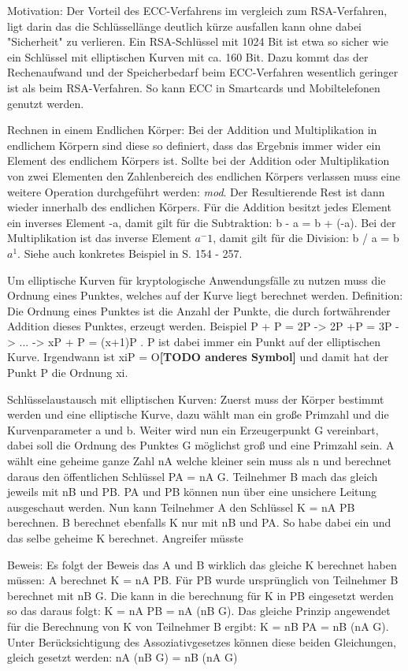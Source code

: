 		
		Motivation: Der Vorteil des ECC-Verfahrens im vergleich zum RSA-Verfahren, ligt darin das die Schlüssellänge deutlich kürze ausfallen kann ohne dabei "Sicherheit" zu verlieren. Ein RSA-Schlüssel mit 1024 Bit ist etwa so sicher wie ein Schlüssel mit elliptischen Kurven mit ca. 160 Bit. Dazu kommt das der Rechenaufwand und der Speicherbedarf beim ECC-Verfahren wesentlich geringer ist als beim RSA-Verfahren. So kann ECC in Smartcards und Mobiltelefonen genutzt werden.\cite{Information:und:Kommunikation}
		
		
		Rechnen in einem Endlichen Körper: Bei der Addition und Multiplikation in endlichem Körpern sind diese so definiert, dass das Ergebnis immer wider ein Element des endlichem Körpers ist. Sollte bei der Addition oder Multiplikation von zwei Elementen den Zahlenbereich des endlichen Körpers verlassen muss eine weitere Operation durchgeführt werden: \textit{mod}. Der Resultierende Rest ist dann wieder innerhalb des endlichen Körpers. Für die Addition besitzt jedes Element ein inverses Element -a, damit gilt für die Subtraktion: b - a = b + (-a). Bei der Multiplikation ist das inverse Element $a^-1$, damit gilt für die Division: b / a = b \mycdot $a^1$. Siehe auch konkretes Beispiel in \cite{Information:und:Kommunikation} S. 154 - 257.
		
		Um elliptische Kurven für kryptologische Anwendungsfälle zu nutzen muss die Ordnung eines Punktes, welches auf der Kurve liegt berechnet werden. Definition: Die Ordnung eines Punktes ist die Anzahl der Punkte, die durch fortwährender Addition dieses Punktes, erzeugt werden. Beispiel P + P = 2P -> 2P +P = 3P -> ... -> xP + P = (x+1)P . P ist dabei immer ein Punkt auf der elliptischen Kurve. Irgendwann ist xiP = O\textbf{[TODO anderes Symbol]} und damit hat der Punkt P die Ordnung xi.
		
		Schlüsselaustausch  mit elliptischen  Kurven: Zuerst muss der Körper bestimmt werden und eine elliptische Kurve, dazu wählt man ein große Primzahl und die Kurvenparameter a und b. Weiter wird nun ein Erzeugerpunkt G vereinbart, dabei soll die Ordnung des Punktes G möglichst groß und eine Primzahl sein. A wählt eine geheime ganze Zahl nA welche kleiner sein muss als n und berechnet daraus den öffentlichen Schlüssel PA = nA \mycdot G. Teilnehmer B mach das gleich jeweils mit nB und PB. PA und PB können nun über eine unsichere Leitung ausgeschaut werden. Nun kann Teilnehmer A den Schlüssel K = nA \mycdot PB berechnen. B berechnet ebenfalls K nur mit nB und PA. So habe dabei ein und das selbe geheime K berechnet. Angreifer müsste
		
		Beweis: Es folgt der Beweis das A und B wirklich das gleiche K berechnet haben müssen: A berechnet K = nA \mycdot PB. Für PB wurde ursprünglich von Teilnehmer B berechnet mit nB \mycdot G. Die kann in die berechnung für K in PB eingesetzt werden so das daraus folgt: K = nA \mycdot PB = nA \mycdot (nB \mycdot G). Das gleiche Prinzip angewendet für die Berechnung von K von Teilnehmer B ergibt: K = nB \mycdot PA = nB \mycdot (nA \mycdot G). Unter Berücksichtigung des Assoziativgesetzes können diese beiden Gleichungen, gleich gesetzt werden: nA \mycdot (nB \mycdot G) = nB \mycdot (nA \mycdot G)